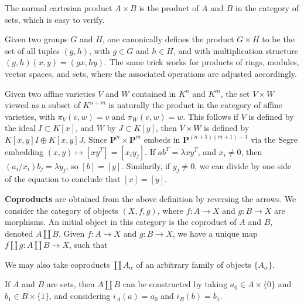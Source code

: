 \begin{example}
    The normal cartesian product $A \times B$ is the product of $A$ and $B$ in the category of sets, which is easy to verify.
\end{example}

\begin{example}
    Given two groups $G$ and $H$, one canonically defines the product $G \times H$ to be the set of all tuples $(g,h)$, with $g \in G$ and $h \in H$, and with multiplication structure $(g,h)(x,y) = (gx,hy)$. The same trick works for products of rings, modules, vector spaces, and sets, where the associated operations are adjusted accordingly.
\end{example}

\begin{example}
    Given two affine varieties $V$ and $W$ contained in $K^n$ and $K^m$, the set $V \times W$ viewed as a subset of $K^{n+m}$ is naturally the product in the category of affine varieties, with $\pi_V(v,w) = v$ and $\pi_W(v,w) = w$. This follows if $V$ is defined by the ideal $I \subset K[x]$, and $W$ by $J \subset K[y]$, then $V \times W$ is defined by $K[x,y] I \oplus K[x,y] J$. Since $\mathbf{P}^n \times \mathbf{P}^m$ embeds in $\mathbf{P}^{(n+1)(m+1) - 1}$ via the Segre embedding $(x,y) \mapsto [x y^T] = [x_i y_j]$. If $ab^T = \lambda xy^T$, and $x_i \neq 0$, then $(a_i/x_i) b_j = \lambda y_j$, so $[b] = [y]$. Similarily, if $y_j \neq 0$, we can divide by one side of the equation to conclude that $[x] = [y]$.
\end{example}

{\bf Coproducts} are obtained from the above definition by reversing the arrows. We consider the category of objects $(X,f,g)$, where $f: A \to X$ and $g: B \to X$ are morphisms. An initial object in this category is the coproduct of $A$ and $B$, denoted $A \amalg B$. Given $f: A \to X$ and $g: B \to X$, we have a unique map $f \amalg g: A \amalg B \to X$, such that
%
\begin{center}
\end{center}
%
We may also take coproducts $\coprod A_\alpha$ of an arbitrary family of objects $\{ A_\alpha \}$.

\begin{example}
    If $A$ and $B$ are sets, then $A \amalg B$ can be constructed by taking $a_0 \in A \times \{ 0 \}$ and $b_1 \in B \times \{ 1 \}$, and considering $i_A(a) = a_0$ and $i_B(b) = b_1$. 
\end{example}

